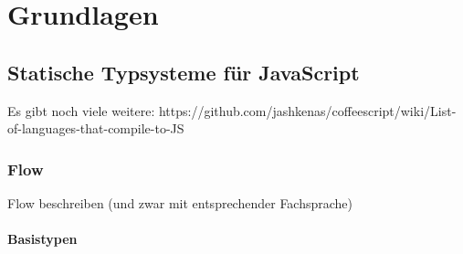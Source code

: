 \chapter{Grundlagen}
\label{chap:basics}

\section{Statische Typsysteme für JavaScript}

Es gibt noch viele weitere: https://github.com/jashkenas/coffeescript/wiki/List-of-languages-that-compile-to-JS

\subsection{Flow}
  Flow beschreiben (und zwar mit entsprechender Fachsprache)

\subsubsection{Basistypen}

